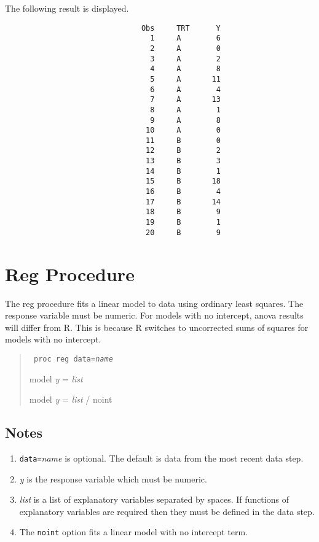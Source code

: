 \documentclass[11pt]{article}
\begin{document}
The following result is displayed.

\begin{Verbatim}
                               Obs     TRT      Y
                                 1     A        6
                                 2     A        0
                                 3     A        2
                                 4     A        8
                                 5     A       11
                                 6     A        4
                                 7     A       13
                                 8     A        1
                                 9     A        8
                                10     A        0
                                11     B        0
                                12     B        2
                                13     B        3
                                14     B        1
                                15     B       18
                                16     B        4
                                17     B       14
                                18     B        9
                                19     B        1
                                20     B        9
\end{Verbatim}

\newpage

\section{Reg Procedure}
The reg procedure fits a linear model to data
using ordinary least squares.
The response variable must be numeric.
For models with no intercept, anova results will differ from R.
This is because R switches to uncorrected sums of squares
for models with no intercept.

\begin{quote}
{\tt
proc reg data={\it name}

model {\it y} = {\it list}

model {\it y} = {\it list} / noint
}
\end{quote}

\subsection*{Notes}
\begin{enumerate}
\item
{\tt data=}{\it name} is optional.
The default is data from the most recent data step.
\item
{\it y} is the response variable which must be numeric.
\item
{\it list} is a list of explanatory variables separated by spaces.
If functions of explanatory variables are required then
they must be defined in the data step.
\item
The {\tt noint} option fits a linear model with no intercept term.
\end{enumerate}
\end{document}
